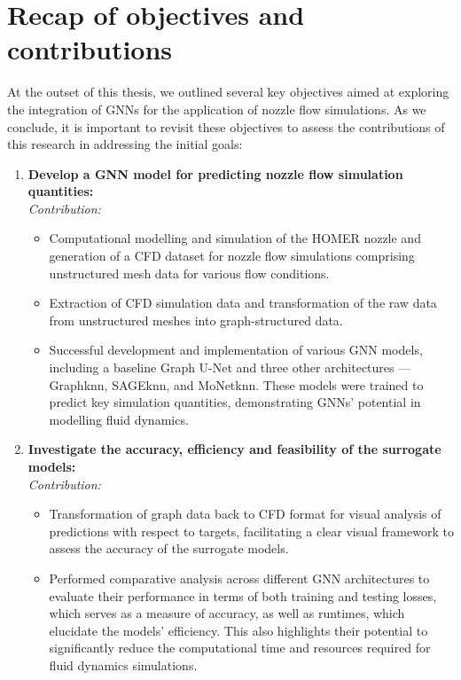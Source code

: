 \section{Recap of objectives and contributions}
At the outset of this thesis, we outlined several key objectives aimed at exploring the integration of GNNs for the application of nozzle flow simulations. As we conclude, it is important to revisit these objectives to assess the contributions of this research in addressing the initial goals:
\begin{enumerate}
    \item \textbf{Develop a GNN model for predicting nozzle flow simulation quantities:} \\
    \textit{Contribution:}
    \begin{itemize}
        \item Computational modelling and simulation of the HOMER nozzle and generation of a CFD dataset for nozzle flow simulations comprising unstructured mesh data for various flow conditions. 
        \item Extraction of CFD simulation data and transformation of the raw data from unstructured meshes into graph-structured data.
        \item Successful development and implementation of various GNN models, including a baseline Graph U-Net and three other architectures — Graphknn, SAGEknn, and MoNetknn. These models were trained to predict key simulation quantities, demonstrating GNNs' potential in modelling fluid dynamics.
    \end{itemize}   
    \item \textbf{Investigate the accuracy, efficiency and feasibility of the surrogate models:} \\
    \textit{Contribution:}
    \begin{itemize}
        \item Transformation of graph data back to CFD format for visual analysis of predictions with respect to targets, facilitating a clear visual framework to assess the accuracy of the surrogate models.
        \item Performed comparative analysis across different GNN architectures to evaluate their performance in terms of both training and testing losses, which serves as a measure of accuracy, as well as runtimes, which elucidate the models' efficiency. This also highlights their potential to significantly reduce the computational time and resources required for fluid dynamics simulations. 
    \end{itemize}

\end{enumerate}
